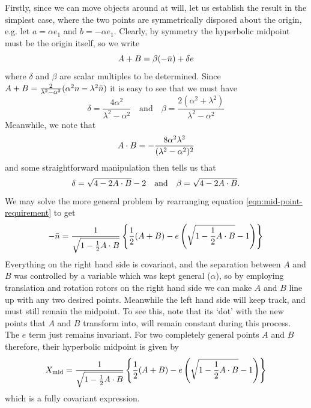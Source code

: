 Firstly, since we can move objects around at will, let us
establish the result in the simplest case, where the two
points are symmetrically disposed about the origin, e.g.
let $a=\alpha e_1$ and $b=-\alpha e_1$. Clearly, by
symmetry the hyperbolic midpoint must be the origin
itself, so we write
%
\begin{equation} \label{eqn:mid-point-requirement}
A+B = \beta (-\bar{n}) + \delta e
\end{equation}
%
where $\delta$ and $\beta$ are scalar multiples to be determined.
Since $A+B = \frac{2}{\lambda^2 - \alpha^2}(\alpha^2 n - \lambda^2
\bar{n})$ it is easy to see that we must have
%
\begin{equation}
\delta = \frac{4\alpha^2}{\lambda^2-\alpha^2} \quad
\text{and} \quad \beta =
\frac{2(\alpha^2+\lambda^2)}{\lambda^2-\alpha^2}
\end{equation}
%
Meanwhile, we note that
%
\begin{equation}
A\cdot B = -\frac{8 \alpha^2
\lambda^2}{(\lambda^2-\alpha^2)^2}
\end{equation}
%
and some straightforward manipulation then tells us that
%
\begin{equation} \label{eqn:delta-beta-results}
\delta=\sqrt{4-2 A\cdot B} -2 \quad \text{and} \quad \beta
= \sqrt{4-2 A\cdot B}.
\end{equation}
%
We may solve the more general problem by rearranging 
equation \ref{eqn:mid-point-requirement} to get
%
\begin{equation}
-\bar{n} = \frac{1}{\sqrt{1-\frac{1}{2} A \cdot B}} \left\{
\frac{1}{2} (A+B) - e \left(\sqrt{1-\frac{1}{2} A \cdot
B}-1\right) \right\}
\end{equation}
%
Everything on the right hand side is covariant, and the separation between
$A$ and $B$ was controlled by a variable which was kept general
($\alpha$), so by employing translation and rotation rotors on the
right hand side we can make $A$ and $B$ line up with any two desired
points. Meanwhile the left hand side will keep track, and must still
remain the midpoint. To see this, note that its `dot' with the
new points that $A$ and $B$ transform into, will remain constant
during this process. The $e$ term just remains invariant. For two
completely general points $A$ and $B$ therefore, their
hyperbolic midpoint is given by
%
\begin{equation} \label{eqn:mid-point-expr}
X_{\rm mid} = \frac{1}{\sqrt{1-\frac{1}{2} A \cdot B}}
\left\{ \frac{1}{2} (A+B) - e \left(\sqrt{1-\frac{1}{2} A \cdot
B}-1\right) \right\}
\end{equation}
%
which is a fully covariant expression.

